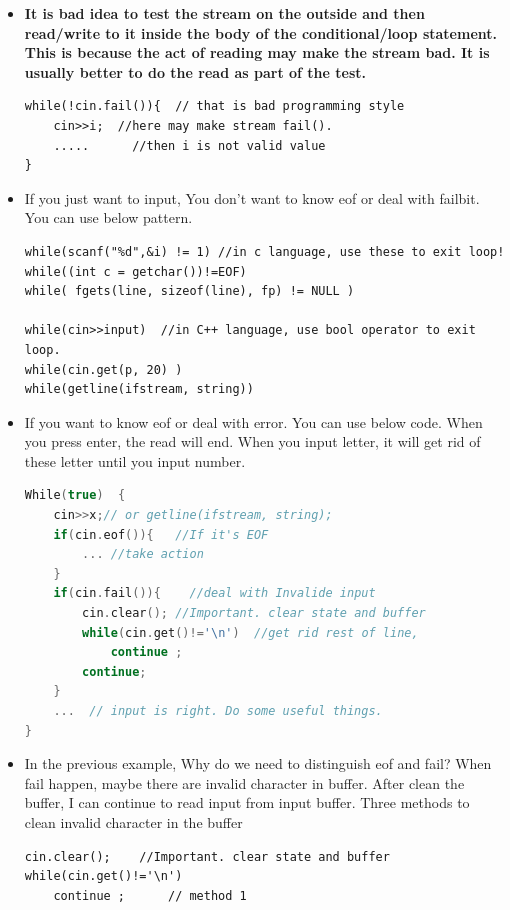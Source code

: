 \documentclass[a4paper,11pt,twoside]{book}
\begin{document}
\begin{itemize}
	\item \textbf{It is bad idea to test the stream on the outside and then read/write to it inside the body of the conditional/loop statement. This is because the act of reading may make the stream bad. It is usually better to do the read as part of the test.}
	
\begin{lstlisting}[numbers=none]
while(!cin.fail()){  // that is bad programming style
	cin>>i;  //here may make stream fail().
	.....      //then i is not valid value
}
\end{lstlisting}
	
	\item If you just want to input, You don't want to know eof or deal with failbit. You can use below pattern.
	
\begin{lstlisting}[numbers=none]
while(scanf("%d",&i) != 1) //in c language, use these to exit loop!
while((int c = getchar())!=EOF)
while( fgets(line, sizeof(line), fp) != NULL )
	
while(cin>>input)  //in C++ language, use bool operator to exit loop.
while(cin.get(p, 20) )
while(getline(ifstream, string))
\end{lstlisting}
	
	\item If you want to know eof or deal with error. You can use below code. When you press enter, the read will end. When you input letter, it will get rid of these letter until you input number. 
\begin{lstlisting}[frame=single, language=c++]
While(true)  {
    cin>>x;// or getline(ifstream, string);
	if(cin.eof()){   //If it's EOF
		... //take action
	}	
	if(cin.fail()){    //deal with Invalide input
		cin.clear(); //Important. clear state and buffer
		while(cin.get()!='\n')  //get rid rest of line,
			continue ;
		continue;
	}
	...  // input is right. Do some useful things.
}
\end{lstlisting}
	
	\item In the previous example, Why do we need to distinguish eof and fail? When fail happen, maybe there are invalid character in buffer. After clean the buffer, I can continue to read input from input buffer. Three methods to clean invalid character in the buffer
\begin{lstlisting}[numbers=none]
cin.clear();    //Important. clear state and buffer
while(cin.get()!='\n')
	continue ;      // method 1
	

\end{lstlisting}
\end{itemize}
\end{document}
